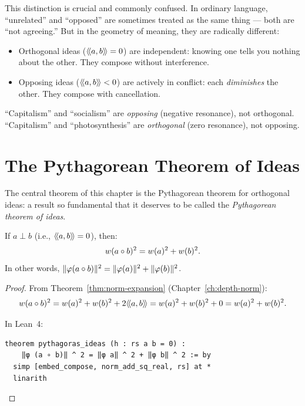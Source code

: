 \begin{remark}
\label{rmk:orth-vs-opp}
This distinction is crucial and commonly confused. In ordinary language,
``unrelated'' and ``opposed'' are sometimes treated as the same thing ---
both are ``not agreeing.'' But in the geometry of meaning, they are radically
different:
\begin{itemize}
\item Orthogonal ideas ($\langle\!\langle a, b \rangle\!\rangle = 0$) are independent: knowing one tells
you nothing about the other. They compose without interference.
\item Opposing ideas ($\langle\!\langle a, b \rangle\!\rangle < 0$) are actively in conflict: each
\emph{diminishes} the other. They compose with cancellation.
\end{itemize}
``Capitalism'' and ``socialism'' are \emph{opposing} (negative resonance), not
orthogonal. ``Capitalism'' and ``photosynthesis'' are \emph{orthogonal} (zero
resonance), not opposing.
\end{remark}


\section{The Pythagorean Theorem of Ideas}

The central theorem of this chapter is the Pythagorean theorem for orthogonal
ideas: a result so fundamental that it deserves to be called the
\emph{Pythagorean theorem of ideas}.

\begin{theorem}
\label{thm:pythagoras}
If $a \perp b$ (i.e., $\langle\!\langle a, b \rangle\!\rangle = 0$), then:
\[
  w(a \circ b)^2 = w(a)^2 + w(b)^2.
\]
In other words, $\lVert \varphi(a \circ b) \rVert^2 = \lVert \varphi(a) \rVert^2 +
\lVert \varphi(b) \rVert^2$.
\end{theorem}

\begin{proof}
From Theorem~\ref{thm:norm-expansion} (Chapter~\ref{ch:depth-norm}):
\[
  w(a \circ b)^2 = w(a)^2 + w(b)^2 + 2\langle\!\langle a, b \rangle\!\rangle = w(a)^2 + w(b)^2 + 0
  = w(a)^2 + w(b)^2.
\]

In Lean~4:
\begin{lstlisting}
theorem pythagoras_ideas (h : rs a b = 0) :
    ‖φ (a ∘ b)‖ ^ 2 = ‖φ a‖ ^ 2 + ‖φ b‖ ^ 2 := by
  simp [embed_compose, norm_add_sq_real, rs] at *
  linarith
\end{lstlisting}
\end{proof}

